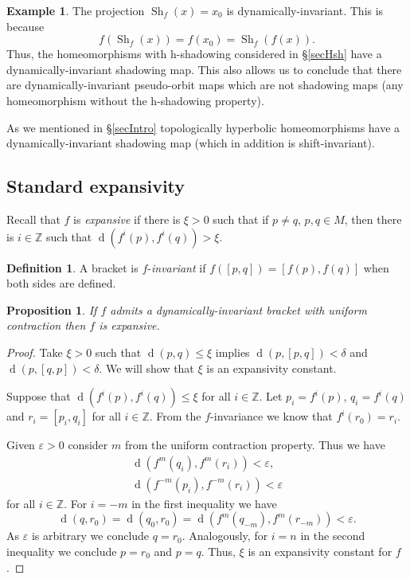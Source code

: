 \documentclass[12pt]{amsart}
\theoremstyle{plain}
\newtheorem{prop}[thm]{Proposition}
\theoremstyle{definition}
\newtheorem{exa}[thm]{Example}
\newtheorem{df}[thm]{Definition}
\theoremstyle{remark}
\DeclareMathOperator{\dist}{d}
\DeclareMathOperator{\shm}{Sh}
\newcommand{\Z}{\mathbb Z}
\renewcommand{\epsilon}{\varepsilon}
\newcommand{\expc}{\xi}
\begin{document}
\begin{exa}
	\label{exaProjTildefInv}
	The projection $\shm_f(x)=x_0$ is dynamically-invariant.
	This is because
	\[
	f (\shm_f(x))=f(x_0)=\shm_f (f(x)).
	\]
	Thus, the homeomorphisms with h-shadowing considered in \S\ref{secHsh} have a dynamically-invariant shadowing map.
	This also allows us to conclude that there are dynamically-invariant pseudo-orbit maps which are not shadowing maps (any homeomorphism without the h-shadowing property).
\end{exa}

As we mentioned in \S\ref{secIntro} topologically hyperbolic homeomorphisms have a
dynamically-invariant shadowing map (which in addition is shift-invariant).

\subsection{Standard expansivity}
\label{secStandard expansivity}
Recall that $f$ is \textit{expansive} if there is $\expc>0$ such that if $p\neq q$, $p,q\in M$, then there is $i\in\Z$ such that $\dist(f^i(p),f^i(q))>\expc$.
\begin{df}
	A bracket is $f$-\textit{invariant} if
	$f([p,q])=[f(p),f(q)]$ when both sides are defined.
\end{df}

\begin{prop}
	\label{propExpDesdeCorchete}
	If $f$ admits a dynamically-invariant bracket with uniform contraction then $f$ is expansive.
\end{prop}

\begin{proof}
	Take $\expc>0$ such that $\dist(p,q)\leq\expc$ implies $\dist(p,[p,q])<\delta$ and
	$\dist(p,[q,p])<\delta$.
	We will show that $\expc$ is an expansivity constant.

	Suppose that $\dist(f^i(p),f^i(q))\leq \expc$ for all $i\in\Z$.
	Let $p_i=f^i(p)$, $q_i=f^i(q)$ and $r_i=[p_i,q_i]$ for all $i\in\Z$.
	From the $f$-invariance we know that $f^i(r_0)=r_i$.

	Given $\epsilon>0$ consider $m$ from the uniform contraction property.
	Thus we have
	\begin{align*}
		\dist(f^m(q_i),f^m(r_i))<\epsilon,\\
		\dist(f^{-m}(p_i),f^{-m}(r_i))<\epsilon
	\end{align*}
	for all $i\in\Z$.
	For $i=-m$ in the first inequality we have
	\[
	\dist(q,r_0)=\dist(q_0,r_0)=\dist(f^m(q_{-m}),f^m(r_{-m}))<\epsilon.
	\]
	As $\epsilon$ is arbitrary we conclude $q=r_0$.
	Analogously, for $i=n$ in the second inequality we conclude $p=r_0$ and $p=q$.
	Thus, $\expc$ is an expansivity constant for $f$.
\end{proof}
\end{document}
